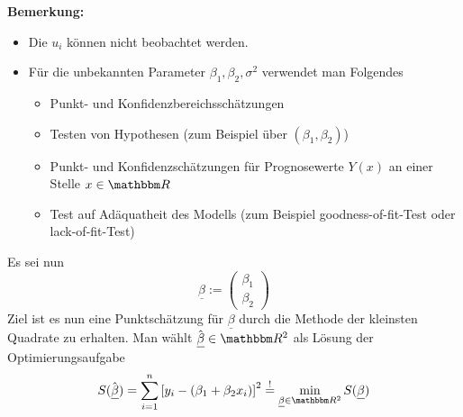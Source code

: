			\textbf{Bemerkung:}
			\begin{itemize}
				\item Die $u_i$ können nicht beobachtet werden.
				\item Für die unbekannten Parameter $\beta_1,\beta_2,\sigma^2$ verwendet man Folgendes
				\begin{itemize}
					\item Punkt- und Konfidenzbereichsschätzungen
					\item Testen von Hypothesen (zum Beispiel über $(\beta_1, \beta_2)$)
					\item Punkt- und Konfidenzschätzungen für Prognosewerte $Y(x)$ an einer Stelle $x\in\SR$
					\item Test auf Adäquatheit des Modells (zum Beispiel goodness-of-fit-Test oder lack-of-fit-Test)
				\end{itemize}
			\end{itemize}

			Es sei nun
			\[ \underline{\beta} := \begin{pmatrix}
				\beta_1 \\
				\beta_2
			\end{pmatrix} \]
			Ziel ist es nun eine Punktschätzung für $\underline{\beta}$ durch die Methode der kleinsten Quadrate zu erhalten.
			Man wählt $\hat{\underline{\beta}}\in\SR^2$ als Lösung der Optimierungsaufgabe
			\[ S(\hat{\underline{\beta}}) = \sum_{i=1}^n \boxb{y_i - \curvb{\beta_1 + \beta_2 x_i}}^2 \stackrel{!}{=} \min_{\underline{\beta}\in\SR^2} S(\underline{\beta}) \]



